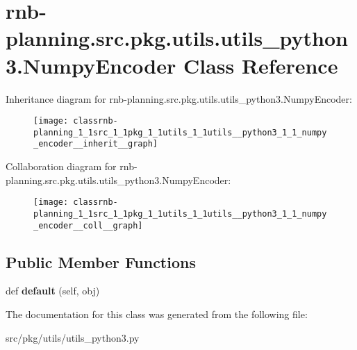 \hypertarget{classrnb-planning_1_1src_1_1pkg_1_1utils_1_1utils__python3_1_1_numpy_encoder}{}\section{rnb-\/planning.src.\+pkg.\+utils.\+utils\+\_\+python3.\+Numpy\+Encoder Class Reference}
\label{classrnb-planning_1_1src_1_1pkg_1_1utils_1_1utils__python3_1_1_numpy_encoder}


Inheritance diagram for rnb-\/planning.src.\+pkg.\+utils.\+utils\+\_\+python3.\+Numpy\+Encoder\+:
\nopagebreak
\begin{figure}[H]
\begin{center}
\leavevmode
\texttt{[image: classrnb-planning\_1\_1src\_1\_1pkg\_1\_1utils\_1\_1utils\_\_python3\_1\_1\_numpy\_encoder\_\_inherit\_\_graph]}
\end{center}
\end{figure}


Collaboration diagram for rnb-\/planning.src.\+pkg.\+utils.\+utils\+\_\+python3.\+Numpy\+Encoder\+:
\nopagebreak
\begin{figure}[H]
\begin{center}
\leavevmode
\texttt{[image: classrnb-planning\_1\_1src\_1\_1pkg\_1\_1utils\_1\_1utils\_\_python3\_1\_1\_numpy\_encoder\_\_coll\_\_graph]}
\end{center}
\end{figure}
\subsection*{Public Member Functions}
\begin{DoxyCompactItemize}
\item 
\mbox{\label{classrnb-planning_1_1src_1_1pkg_1_1utils_1_1utils__python3_1_1_numpy_encoder_ad76c28d68334716885ab99757896b73e}} 
def {\bfseries default} (self, obj)
\end{DoxyCompactItemize}


The documentation for this class was generated from the following file\+:\begin{DoxyCompactItemize}
\item 
src/pkg/utils/utils\+\_\+python3.\+py\end{DoxyCompactItemize}

